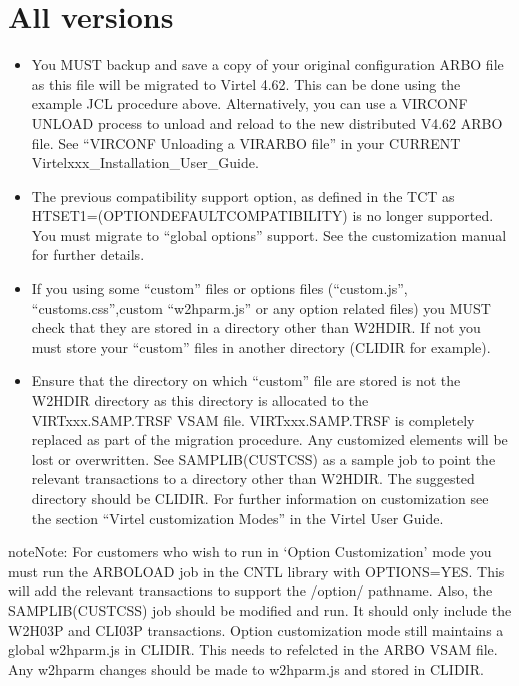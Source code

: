 \documentclass[letterpaper,10pt,english]{sphinxmanual}
\begin{document}
\section{All versions}
\label{\detokenize{Migration_Guide:all-versions}}\begin{itemize}
\item {} 
\sphinxAtStartPar
You MUST backup and save a copy of your original configuration ARBO file as this file will be migrated to Virtel 4.62. This can be done using the example JCL procedure above. Alternatively, you can use a VIRCONF UNLOAD process to unload and reload to the new distributed V4.62 ARBO file. See “VIRCONF \sphinxhyphen{} Unloading a VIRARBO file” in your CURRENT Virtelxxx\_Installation\_User\_Guide.

\item {} 
\sphinxAtStartPar
The previous compatibility support option, as defined in the TCT as HTSET1=(OPTION\sphinxhyphen{}DEFAULT\sphinxhyphen{}COMPATIBILITY) is no longer supported. You must migrate to “global options” support. See the customization manual for further details.

\item {} 
\sphinxAtStartPar
If you using some “custom” files or options files (“custom.js”, “customs.css”,custom “w2hparm.js” or any option related files) you MUST check that they are stored in a directory other than W2H\sphinxhyphen{}DIR. If not you must store your “custom” files in another directory (CLI\sphinxhyphen{}DIR for example).

\item {} 
\sphinxAtStartPar
Ensure that the directory on which “custom” file are stored is not the W2H\sphinxhyphen{}DIR directory as this directory is allocated to the VIRTxxx.SAMP.TRSF VSAM file. VIRTxxx.SAMP.TRSF is completely replaced as part of the migration procedure. Any customized elements will be lost or overwritten. See SAMPLIB(CUSTCSS) as a sample job to point the relevant transactions to a directory other than W2H\sphinxhyphen{}DIR. The suggested directory should be CLI\sphinxhyphen{}DIR. For further information on customization see the section “Virtel customization Modes” in the Virtel User Guide.

\end{itemize}

\begin{sphinxadmonition}{note}{Note:}
\sphinxAtStartPar
For customers who wish to run in ‘Option Customization’ mode you must run the ARBOLOAD job in the CNTL library with OPTIONS=YES. This will add the relevant transactions to support the /option/ pathname. Also, the SAMPLIB(CUSTCSS) job should be modified and run. It should only include the W2H\sphinxhyphen{}03P and CLI\sphinxhyphen{}03P transactions. Option customization mode still maintains a global w2hparm.js in CLI\sphinxhyphen{}DIR. This needs to refelcted in the ARBO VSAM file. Any w2hparm changes should be made to w2hparm.js and stored in CLI\sphinxhyphen{}DIR.
\end{sphinxadmonition}
\end{document}
